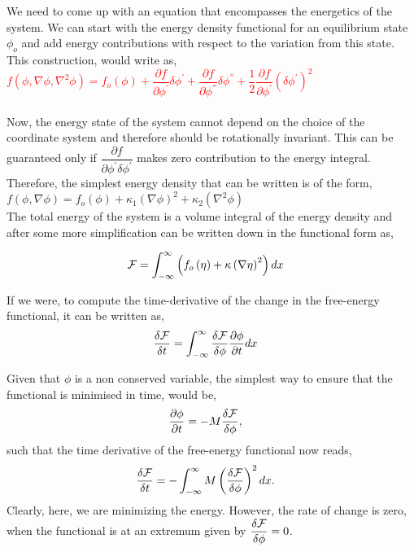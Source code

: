 \documentclass[12pt,a4paper]{report}
\begin{document}
We need to come up with an equation that encompasses the energetics of the system. 
We can start with the energy density functional for an equilibrium state $\phi_o$ and 
add energy contributions with respect to the variation from this state. This construction, 
would write as,\\
\textcolor{red}{$
f\left(\phi,\nabla\phi,\nabla^2\phi\right)= 
f_o\left(\phi\right) + \dfrac{\partial f}{\partial \phi^{'}}\delta\phi^{'} 
+ \dfrac{\partial f}{\partial \phi^{''}}\delta\phi^{''} + \dfrac{1}{2}
\dfrac{\partial f}{\partial \phi^{'}}\left(\delta\phi^{'}\right)^2
$}\\
\\
Now, the energy state of the system cannot depend on the choice of the coordinate system and 
therefore should be rotationally invariant. This can be guaranteed only if 
$\dfrac{\partial f}{\partial \phi^{'}\delta \phi^{'}}$ makes zero contribution to the energy integral. 
Therefore, the simplest energy density that can be written is of the form, \\
$
f\left(\phi,\nabla \phi\right)= 
f_o\left(\phi\right) + \kappa_1\left(\nabla \phi\right)^{2} + \kappa_2\left(\nabla^2 \phi\right) 
$
\\
The total energy of the system is a volume integral of the energy density and after some more simplification 
can be written down in the functional form as,

\begin{align}
 {\cal F} &= \int_{-\infty}^{\infty}\left(f_o\left(\eta\right) + \kappa\left(\nabla \eta\right)^{2}\right) dx
\end{align}

If we were, to compute the time-derivative of the change in the free-energy functional, 
it can be written as, 
\begin{align}
 \dfrac{\delta {\cal F}}{\delta t} &= \int_{-\infty}^{\infty} \dfrac{\delta {\cal F}}{\delta \phi}\dfrac{\partial \phi}{\partial t}dx
 \label{time_derivative_free_energy}
\end{align}

Given that $\phi$ is a non conserved variable, the simplest way to ensure that the 
functional is minimised in time, would be,
\begin{align}
 \dfrac{\partial \phi}{\partial t} &= -M \dfrac{\delta {\cal F}}{\delta \phi},
\end{align}
such that the time derivative of the free-energy functional now reads, 
\begin{align}
 \dfrac{\delta {\cal F}}{\delta t} &= -\int_{-\infty}^{\infty}M\left(\dfrac{\delta {\cal F}}{\delta \phi}\right)^{2}dx.
\end{align}
Clearly, here, we are minimizing the energy. However, the rate of change is zero, 
when the functional is at an extremum given by $\dfrac{\delta {\cal F}}{\delta \phi} = 0$.\\
\end{document}
